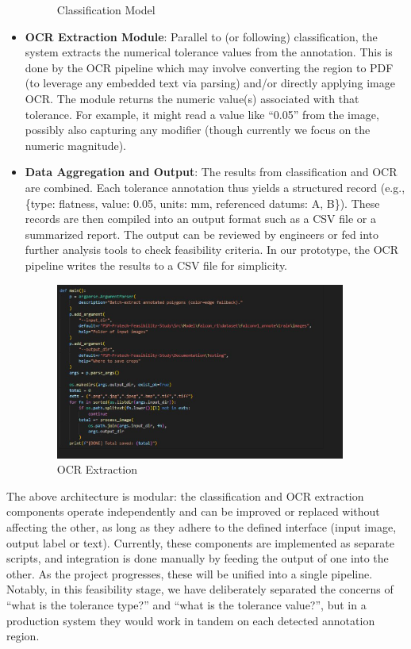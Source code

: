 \documentclass[11pt,a4paper]{article}
\begin{document}
\begin{itemize}
\begin{figure}[h!]
\caption{Classification Model}
\end{figure}
  \item \textbf{OCR Extraction Module}: Parallel to (or following) classification, the system extracts the numerical tolerance values from the annotation. This is done by the OCR pipeline which may involve converting the region to PDF (to leverage any embedded text via parsing) and/or directly applying image OCR. The module returns the numeric value(s) associated with that tolerance. For example, it might read a value like “0.05” from the image, possibly also capturing any modifier (though currently we focus on the numeric magnitude).

  \item \textbf{Data Aggregation and Output}: The results from classification and OCR are combined. Each tolerance annotation thus yields a structured record (e.g., \{type: flatness, value: 0.05, units: mm, referenced datums: A, B\}). These records are then compiled into an output format such as a CSV file or a summarized report. The output can be reviewed by engineers or fed into further analysis tools to check feasibility criteria. In our prototype, the OCR pipeline writes the results to a CSV file for simplicity.
    \begin{figure}[h!]
  \centering
  \includegraphics[width=0.9\textwidth]{OCR Extraction.png}
  \caption{OCR Extraction}
  \end{figure}
\end{itemize}

The above architecture is modular: the classification and OCR extraction components operate independently and can be improved or replaced without affecting the other, as long as they adhere to the defined interface (input image, output label or text). Currently, these components are implemented as separate scripts, and integration is done manually by feeding the output of one into the other. As the project progresses, these will be unified into a single pipeline. Notably, in this feasibility stage, we have deliberately separated the concerns of “what is the tolerance type?” and “what is the tolerance value?”, but in a production system they would work in tandem on each detected annotation region.
\end{document}
